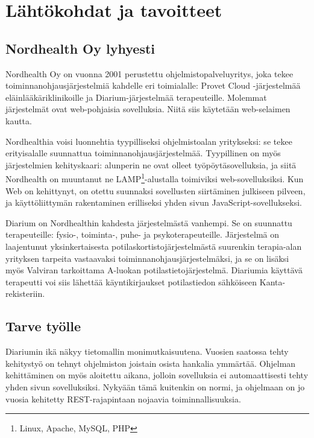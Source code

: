\hypertarget{luxe4htuxf6kohdat-ja-tavoitteet}{%
\chapter{Lähtökohdat ja
tavoitteet}\label{luxe4htuxf6kohdat-ja-tavoitteet}}

\hypertarget{nordhealth-oy-lyhyesti}{%
\section{Nordhealth Oy lyhyesti}\label{nordhealth-oy-lyhyesti}}

Nordhealth Oy on vuonna 2001 perustettu ohjelmistopalveluyritys, joka
tekee toiminnanohjausjärjestelmiä kahdelle eri toimialalle: Provet
Cloud\cite{ProvetCloudHomepage} -järjestelmää eläinlääkäriklinikoille ja
Diarium-järjestelmää\cite{DiariumHomepage} terapeuteille. Molemmat
järjestelmät ovat web-pohjaisia sovelluksia. Niitä siis käytetään
web-selaimen kautta.

Nordhealthia voisi luonnehtia tyypilliseksi ohjelmistoalan yritykseksi:
se tekee erityisalalle suunnattua toiminnanohjausjärjestelmää.
Tyypillinen on myös järjestelmien kehityskaari: alunperin ne ovat olleet
työpöytäsovelluksia, ja siitä Nordhealth on muuntanut ne LAMP\footnote{Linux,
  Apache, MySQL, PHP}-alustalla toimiviksi web-sovelluksiksi. Kun Web on
kehittynyt, on otettu suunnaksi sovellusten siirtäminen julkiseen
pilveen, ja käyttöliittymän rakentaminen erilliseksi yhden sivun
JavaScript-sovellukseksi.

Diarium on Nordhealthin kahdesta järjestelmästä vanhempi. Se on
suunnattu terapeuteille: fysio-, toiminta-, puhe- ja psykoterapeuteille.
Järjestelmä on laajentunut yksinkertaisesta
potilaskortistojärjestelmästä suurenkin terapia-alan yrityksen tarpeita
vastaavaksi toiminnanohjausjärjestelmäksi, ja se on lisäksi myös
Valviran tarkoittama A-luokan potilastietojärjestelmä. Diariumia
käyttävä terapeutti voi siis lähettää käyntikirjaukset potilastiedon
sähköiseen Kanta-rekisteriin.

\hypertarget{tarve-tyuxf6lle}{%
\section{Tarve työlle}\label{tarve-tyuxf6lle}}

Diariumin ikä näkyy tietomallin monimutkaisuutena. Vuosien saatossa
tehty kehitystyö on tehnyt ohjelmiston joistain osista hankalia
ymmärtää. Ohjelman kehittäminen on myös aloitettu aikana, jolloin
sovelluksia ei automaattisesti tehty yhden sivun sovelluksiksi. Nykyään
tämä kuitenkin on normi, ja ohjelmaan on jo vuosia kehitetty
REST-rajapintaan nojaavia toiminnallisuuksia.

